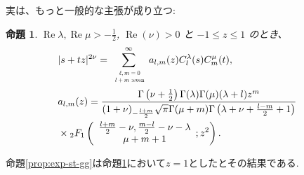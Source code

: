 \documentclass[pdf,notes]{beamer}
\newcommand{\tmop}[1]{\ensuremath{\operatorname{#1}}}
\newtheorem{prop}{命題}
\begin{document}
\begin{frame}
	実は、もっと一般的な主張が成り立つ:
	\begin{prop}\label{prop:exp-stz-gg}
		  \label{thm:4}$\tmop{Re} \lambda, \tmop{Re} \mu > - \frac{1}{2}$,
		    $\tmop{Re} (\nu) > 0$ と $-1 \leqslant z \leqslant 1$ のとき、
		      \begin{eqnarray}
			      & | s + t z |^{2 \nu}  = \sum_{\scalebox{0.6}{
				      $\begin{array}[]{c}
						  \ell,m=0\\l + m\mbox{ :even}
					  \end{array}
				  $}}^{\infty} a_{l, m}
					          (z) C_l^{\lambda} (s) C_m^{\mu} (t), &  \nonumber\\
						      & a_{l, m} (z) = \frac{\Gamma \left( \nu + \frac{1}{2} \right) \Gamma
						      (\lambda) \Gamma (\mu) (\lambda + l) z^m }{(1 + \nu)_{- \frac{l + m}{2}} \sqrt{\pi} \Gamma
										      (\mu + m) \Gamma \left( \lambda + \nu + \frac{l - m}{2} + 1 \right)}&\nonumber
										      \\&\times{}_2 F_1 \left( \begin{array}{c}
								        \frac{l + m}{2} - \nu, \frac{m - l}{2} - \nu - \lambda\\
									      \mu + m + 1
									          \end{array} ; z^2 \right). & 
										          \nonumber
											    \end{eqnarray}
    \end{prop}
    命題\ref{prop:exp-st-gg}は命題\ref{prop:exp-stz-gg}において$z=1$としたとその結果である.
\end{frame}
\end{document}
